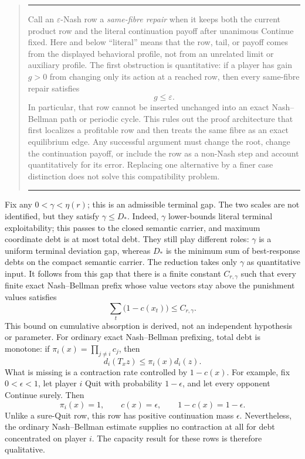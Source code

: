 \documentclass[11pt]{article}
\newenvironment{guidebox}[1]
{\def\guidecolor{#1}\par\medskip\begingroup\color{\guidecolor}%
 \begin{quote}\hrule\medskip\color{black}}
{\par\medskip\color{\guidecolor}\hrule\end{quote}%
 \endgroup\par\medskip}
\begin{document}
\begin{guidebox}{GuideRed}
Call an $\varepsilon$-Nash row a \emph{same-fibre repair} when it keeps both
the current product row and the literal continuation payoff after unanimous
Continue fixed.  Here and below ``literal'' means that the row, tail, or payoff
comes from the displayed behavioral profile, not from an unrelated limit or
auxiliary profile.  The first obstruction is quantitative: if a player has
gain $g>0$ from changing only its action at a reached row, then every
same-fibre repair satisfies
\[
 g\le\varepsilon.
\]
In particular, that row cannot be inserted unchanged into an exact
Nash--Bellman path or periodic cycle.  This rules out the proof architecture
that first localizes a profitable row and then treats the same fibre as an
exact equilibrium edge.  Any successful argument must
change the root, change the continuation payoff, or include the row as a
non-Nash step and account quantitatively for its error.  Replacing one
alternative by a finer case distinction does not solve this compatibility
problem.
\end{guidebox}

Fix any $0<\gamma<\eta(r)$; this is an admissible terminal gap.  The two
scales are not identified, but they satisfy $\gamma\le D_*$.  Indeed,
$\gamma$ lower-bounds literal terminal exploitability; this passes to the
closed semantic carrier, and maximum coordinate debt is at most total debt.
They still play different roles: $\gamma$ is a uniform terminal deviation
gap, whereas $D_*$ is the minimum sum of best-response debts on the compact
semantic carrier.  The reduction takes only $\gamma$ as quantitative input.  It
follows from this gap that there is a finite constant
$C_{r,\gamma}$ such that every finite exact Nash--Bellman prefix whose value
vectors stay above the punishment values satisfies
\[
 \sum_t\bigl(1-c(x_t)\bigr)\le C_{r,\gamma}.
\]
This bound on cumulative absorption is derived, not an independent
hypothesis or parameter.  For ordinary exact Nash--Bellman prefixing, total
debt is monotone: if $\pi_i(x)=\prod_{j\ne i}c_j$, then
\[
 d_i(T_xz)\le \pi_i(x)d_i(z).
\]
What is missing is a contraction rate controlled by $1-c(x)$.  For example,
fix $0<\epsilon<1$, let player $i$ Quit with probability $1-\epsilon$, and
let every opponent Continue surely.  Then
\[
 \pi_i(x)=1,\qquad c(x)=\epsilon,
 \qquad 1-c(x)=1-\epsilon.
\]
Unlike a sure-Quit row, this row has positive continuation mass
$\epsilon$.  Nevertheless, the ordinary Nash--Bellman estimate supplies no
contraction at all for debt concentrated on player $i$.  The capacity result
for these rows is therefore qualitative.
\end{document}
